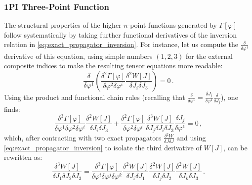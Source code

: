 \subsubsection{1PI Three-Point Function}

The structural properties of the higher \(n\)-point functions generated by \(\Gamma[\varphi]\) follow systematically by taking further functional derivatives of the inversion relation in \eqref{eq:exact_propagator_inversion}. For instance, let us compute the \(\frac{\delta}{\delta \varphi^1}\) derivative of this equation, using simple numbers \((1, 2, 3)\) for the external composite indices to make the resulting tensor equations more readable:
\begin{equation} \label{eq:derivative_inversion_relation}
    \frac{\delta}{\delta \varphi^1} \left( \frac{\delta^2 \Gamma[\varphi]}{\delta \varphi^2 \delta \varphi^i} \frac{\delta^2 W[J]}{\delta J_i \delta J_3} \right) = 0 \, .
\end{equation}
Using the product and functional chain rules (recalling that \(\frac{\delta}{\delta \varphi^1} = \frac{\delta J_j}{\delta \varphi^1} \frac{\delta}{\delta J_j}\)), one finds:
\begin{equation} \label{eq:three_point_chain_rule}
    \frac{\delta^3 \Gamma[\varphi]}{\delta \varphi^1 \delta \varphi^2 \delta \varphi^i} \frac{\delta^2 W[J]}{\delta J_i \delta J_3} + \frac{\delta^2 \Gamma[\varphi]}{\delta \varphi^2 \delta \varphi^i} \frac{\delta^3 W[J]}{\delta J_j \delta J_i \delta J_3} \frac{\delta J_j}{\delta \varphi^1} = 0 \, ,
\end{equation}
which, after contracting with two exact propagators \(\frac{\delta^2 W}{\delta J \delta J}\) and using \eqref{eq:exact_propagator_inversion} to isolate the third derivative of \(W[J]\), can be rewritten as:
\begin{equation} \label{eq:connected_three_point_1pi}
    \frac{\delta^3 W[J]}{\delta J_1 \delta J_2 \delta J_3} = \frac{\delta^3 \Gamma[\varphi]}{\delta \varphi^i \delta \varphi^j \delta \varphi^k} \frac{\delta^2 W[J]}{\delta J_i \delta J_1} \frac{\delta^2 W[J]}{\delta J_j \delta J_2} \frac{\delta^2 W[J]}{\delta J_k \delta J_3} \, .
\end{equation}


